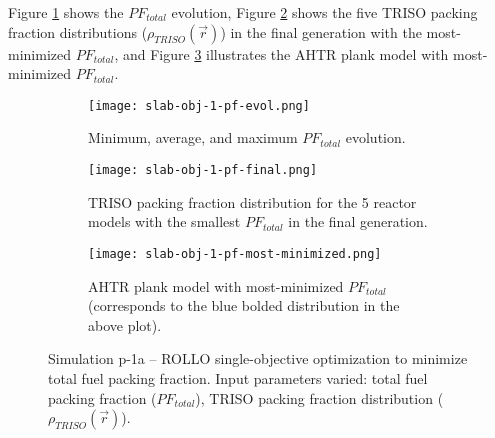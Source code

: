 Figure \ref{fig:slab-obj-1-pf-evol} shows the $PF_{total}$ evolution,  
Figure \ref{fig:slab-obj-1-pf-final} shows the five TRISO packing fraction 
distributions ($\rho_{TRISO}(\vec{r})$) in the final generation with the 
most-minimized $PF_{total}$, and Figure \ref{fig:slab-obj-1-pf-most-minimized} 
illustrates the \gls{AHTR} plank model with most-minimized $PF_{total}$.
\begin{figure}[htbp!]
    \centering
    \begin{subfigure}{0.95\textwidth}
        \texttt{[image: slab-obj-1-pf-evol.png]}
        \caption{Minimum, average, and maximum $PF_{total}$ evolution.}
        \label{fig:slab-obj-1-pf-evol} 
    \end{subfigure}
    \begin{subfigure}{0.95\textwidth}
        \texttt{[image: slab-obj-1-pf-final.png]}
        \caption{TRISO packing fraction distribution for the 5 reactor models with the 
        smallest $PF_{total}$ in the final generation.}
        \label{fig:slab-obj-1-pf-final} 
    \end{subfigure}
    \begin{subfigure}{0.95\textwidth}
        \texttt{[image: slab-obj-1-pf-most-minimized.png]}
        \caption{\gls{AHTR} plank model with most-minimized $PF_{total}$ 
        (corresponds to the blue bolded distribution in the above plot).}
        \label{fig:slab-obj-1-pf-most-minimized} 
    \end{subfigure}
    \caption{Simulation p-1a -- ROLLO single-objective optimization to minimize total 
    fuel packing fraction. Input parameters varied: total fuel packing fraction 
    ($PF_{total}$), \gls{TRISO} packing fraction distribution ($\rho_{TRISO}(\vec{r})$).}
    \label{fig:slab-obj-1-pf}
\end{figure}


